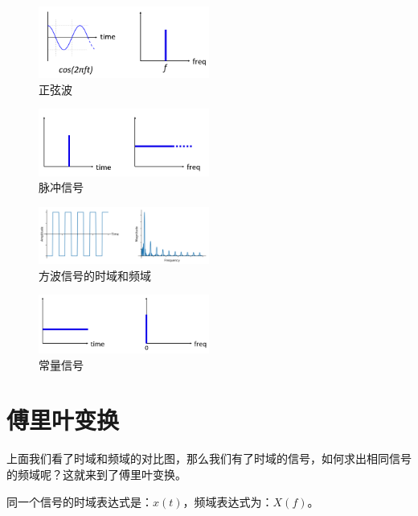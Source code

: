 \documentclass[lang=cn,newtx,10pt,scheme=chinese]{elegantbook}
\begin{document}
\begin{figure}[!htb]
\centering
\includegraphics[width=0.5\textwidth]{sine-wave.png}
\caption{正弦波}
\label{fig:sine-wave}
\end{figure}

\begin{figure}[!htb]
\centering
\includegraphics[width=0.5\textwidth]{impulse.png}
\caption{脉冲信号}
\label{fig:impulse}
\end{figure}

\begin{figure}[!htb]
\centering
\includegraphics[width=0.5\textwidth]{square-wave.pdf}
\caption{方波信号的时域和频域}
\label{fig:square-wave}
\end{figure}

\begin{figure}[!htb]
\centering
\includegraphics[width=0.5\textwidth]{dc-signal.png}
\caption{常量信号}
\label{fig:dc-signal}
\end{figure}

\section{傅里叶变换}

上面我们看了时域和频域的对比图，那么我们有了时域的信号，如何求出相同信号的频域呢？这就来到了傅里叶变换。

同一个信号的时域表达式是：$x(t)$，频域表达式为：$X(f)$。
\end{document}
